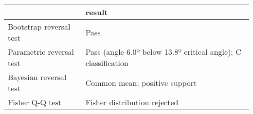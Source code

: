 \begin{tabular}{ll}
\toprule
{} &                                                          result \\
\midrule
Bootstrap reversal test  &                                                            Pass \\
Parametric reversal test &  Pass (angle 6.0º below 13.8º critical angle); C classification \\
Bayesian reversal test   &                                   Common mean: positive support \\
Fisher Q-Q test          &                                    Fisher distribution rejected \\
\bottomrule
\end{tabular}
